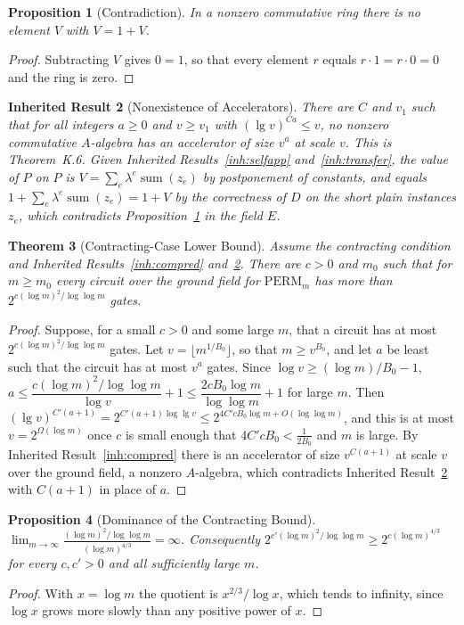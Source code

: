 \documentclass[11pt,letterpaper]{report}
\theoremstyle{plain}
\newtheorem{theorem}{Theorem}[chapter]
\newtheorem{proposition}[theorem]{Proposition}
\newtheorem{inherited}[theorem]{Inherited Result}
\theoremstyle{definition}
\theoremstyle{remark}
\begin{document}
\begin{proposition}[Contradiction]\label{pr:contra}
In a nonzero commutative ring there is no element $V$ with $V=1+V$.
\end{proposition}
\begin{proof}
Subtracting $V$ gives $0=1$, so that every element $r$ equals $r\cdot1=r\cdot0=0$ and the ring is zero.
\end{proof}

\begin{inherited}[Nonexistence of Accelerators]\label{inh:noacc}
There are $C$ and $v_1$ such that for all integers $a\ge0$ and $v\ge v_1$ with $(\lg v)^{Ca}\le v$, no nonzero commutative $A$-algebra has an accelerator of size $v^a$ at scale $v$. This is Theorem~K.6. Given Inherited Results~\ref{inh:selfapp} and~\ref{inh:transfer}, the value of $P$ on $P$ is $V=\sum_e\lambda^e\operatorname{sum}(z_e)$ by postponement of constants, and equals $1+\sum_e\lambda^e\operatorname{sum}(z_e)=1+V$ by the correctness of $D$ on the short plain instances $z_e$, which contradicts Proposition~\ref{pr:contra} in the field $E$.
\end{inherited}

\begin{theorem}[Contracting-Case Lower Bound]\label{th:contractlb}
Assume the contracting condition and Inherited Results~\ref{inh:compred} and~\ref{inh:noacc}. There are $c>0$ and $m_0$ such that for $m\ge m_0$ every circuit over the ground field for $\mathrm{PERM}_m$ has more than $2^{c(\log m)^2/\log\log m}$ gates.
\end{theorem}
\begin{proof}
Suppose, for a small $c>0$ and some large $m$, that a circuit has at most $2^{c(\log m)^2/\log\log m}$ gates. Let $v=\lfloor m^{1/B_0}\rfloor$, so that $m\ge v^{B_0}$, and let $a$ be least such that the circuit has at most $v^a$ gates. Since $\log v\ge(\log m)/B_0-1$, $a\le\dfrac{c(\log m)^2/\log\log m}{\log v}+1\le\dfrac{2cB_0\log m}{\log\log m}+1$ for large $m$. Then $(\lg v)^{C'(a+1)}=2^{C'(a+1)\log\lg v}\le2^{4C'cB_0\log m+O(\log\log m)}$, and this is at most $v=2^{\Omega(\log m)}$ once $c$ is small enough that $4C'cB_0<\tfrac1{2B_0}$ and $m$ is large. By Inherited Result~\ref{inh:compred} there is an accelerator of size $v^{C(a+1)}$ at scale $v$ over the ground field, a nonzero $A$-algebra, which contradicts Inherited Result~\ref{inh:noacc} with $C(a+1)$ in place of $a$.
\end{proof}

\begin{proposition}[Dominance of the Contracting Bound]\label{pr:dominance}
$\displaystyle\lim_{m\to\infty}\frac{(\log m)^2/\log\log m}{(\log m)^{4/3}}=\infty$. Consequently $2^{c'(\log m)^2/\log\log m}\ge2^{c(\log m)^{4/3}}$ for every $c,c'>0$ and all sufficiently large $m$.
\end{proposition}
\begin{proof}
With $x=\log m$ the quotient is $x^{2/3}/\log x$, which tends to infinity, since $\log x$ grows more slowly than any positive power of $x$.
\end{proof}
\end{document}
